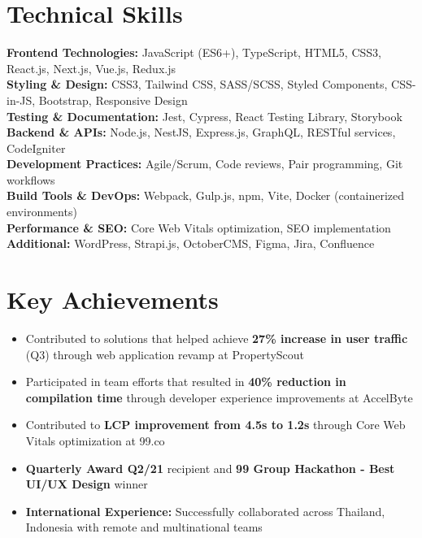 \documentclass[a4paper, 11pt]{article}
\begin{document}
\section{Technical Skills}
 \begin{itemize}[leftmargin=0.15in, label={}]
    \small{\item{
     \textbf{Frontend Technologies:} JavaScript (ES6+), TypeScript, HTML5, CSS3, React.js, Next.js, Vue.js, Redux.js \\
     \textbf{Styling \& Design:} CSS3, Tailwind CSS, SASS/SCSS, Styled Components, CSS-in-JS, Bootstrap, Responsive Design \\
     \textbf{Testing \& Documentation:} Jest, Cypress, React Testing Library, Storybook \\
     \textbf{Backend \& APIs:} Node.js, NestJS, Express.js, GraphQL, RESTful services, CodeIgniter \\
     \textbf{Development Practices:} Agile/Scrum, Code reviews, Pair programming, Git workflows \\
     \textbf{Build Tools \& DevOps:} Webpack, Gulp.js, npm, Vite, Docker (containerized environments) \\
     \textbf{Performance \& SEO:} Core Web Vitals optimization, SEO implementation \\
     \textbf{Additional:} WordPress, Strapi.js, OctoberCMS, Figma, Jira, Confluence
    }}
 \end{itemize}

\section{Key Achievements}
\vspace{2pt}
\small{
\begin{itemize}[leftmargin=0.15in, label=$\bullet$]
    \item Contributed to solutions that helped achieve \textbf{27\% increase in user traffic} (Q3) through web application revamp at PropertyScout
    \item Participated in team efforts that resulted in \textbf{40\% reduction in compilation time} through developer experience improvements at AccelByte
    \item Contributed to \textbf{LCP improvement from 4.5s to 1.2s} through Core Web Vitals optimization at 99.co
    \item \textbf{Quarterly Award Q2/21} recipient and \textbf{99 Group Hackathon - Best UI/UX Design} winner
    \item \textbf{International Experience:} Successfully collaborated across Thailand, Indonesia with remote and multinational teams
\end{itemize}
}
\vspace{5pt}
\end{document}
